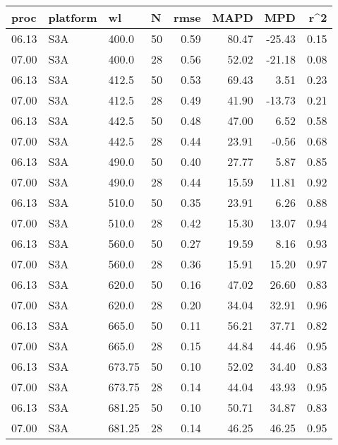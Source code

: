 \documentclass[preview]{standalone}
\begin{document}
\footnotesize



\begin{table}

\begin{tabular}{llllrrrr}
\toprule
                   proc & platform &      wl &   N &  rmse &   MAPD &     MPD &  r\textasciicircum 2 \\
\midrule
06.13 &  S3A &   400.0 &  50 &  0.59 &  80.47 & -25.43 & 0.15 \\
07.00 &  S3A &   400.0 &  28 &  0.56 &   52.02 &  -21.18 & 0.08 \\\hline
06.13 &  S3A &   412.5 &  50 &  0.53 &  69.43 &   3.51 & 0.23 \\
07.00 &  S3A &   412.5 &  28 &  0.49 &   41.90 &  -13.73 & 0.21 \\\hline
06.13 &  S3A &   442.5 &  50 &  0.48 &  47.00 &   6.52 & 0.58 \\
07.00 &  S3A &   442.5 &  28 &  0.44 &   23.91 &   -0.56 & 0.68 \\\hline
06.13 &  S3A &   490.0 &  50 &  0.40 &  27.77 &   5.87 & 0.85 \\
07.00 &  S3A &   490.0 &  28 &  0.44 &   15.59 &   11.81 & 0.92 \\\hline
06.13 &  S3A &   510.0 &  50 &  0.35 &  23.91 &   6.26 & 0.88 \\
07.00 &  S3A &   510.0 &  28 &  0.42 &   15.30 &   13.07 & 0.94 \\\hline
06.13 &  S3A &   560.0 &  50 &  0.27 &  19.59 &   8.16 & 0.93 \\
07.00 &  S3A &   560.0 &  28 &  0.36 &   15.91 &   15.20 & 0.97 \\\hline
06.13 &  S3A &   620.0 &  50 &  0.16 &  47.02 &  26.60 & 0.83 \\
07.00 &  S3A &   620.0 &  28 &  0.20 &   34.04 &   32.91 & 0.96 \\\hline
06.13 &  S3A &   665.0 &  50 &  0.11 &  56.21 &  37.71 & 0.82 \\
07.00 &  S3A &   665.0 &  28 &  0.15 &   44.84 &   44.46 & 0.95 \\\hline
06.13 &  S3A &  673.75 &  50 &  0.10 &  52.02 &  34.40 & 0.83 \\
07.00 &  S3A &  673.75 &  28 &  0.14 &   44.04 &   43.93 & 0.95 \\\hline
06.13 &  S3A &  681.25 &  50 &  0.10 &  50.71 &  34.87 & 0.83 \\
07.00 &  S3A &  681.25 &  28 &  0.14 &   46.25 &   46.25 & 0.95 \\\hline

\end{tabular}
\end{table}
\end{document}
